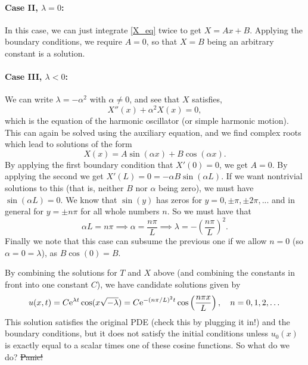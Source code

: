 \documentclass[main.tex]{subfiles}
\begin{document}
\paragraph{Case II, $\lambda=0$:} In this case, we can just integrate \cref{X_eq} twice to get $X = Ax + B$. Applying the boundary conditions, we require $A = 0$, so that $X = B$ being an arbitrary constant is a solution.

\paragraph{Case III, $\lambda<0$:} We can write $\lambda = -\alpha^2$ with $\alpha \neq 0$, and see that $X$ satisfies,
\begin{equation}
    X''(x) + \alpha^2 X(x) = 0,
\end{equation}
which is the equation of the harmonic oscillator (or simple harmonic motion). This can again be solved using the auxiliary equation, and we find complex roots which lead to solutions of the form
\begin{equation}
	X(x) = A \sin(\alpha x) + B \cos(\alpha x).
\end{equation}
By applying the first boundary condition that $X'(0) = 0$, we get $A=0$. By applying the second we get $X'(L) = 0 = -\alpha B \sin(\alpha L)$. If we want nontrivial solutions to this (that is, neither $B$ nor $\alpha$ being zero), we must have $\sin(\alpha L) = 0$. We know that $\sin(y)$ has zeros for $y = 0, \pm\pi, \pm2\pi, ...$ and in general for $y = \pm n\pi$ for all whole numbers $n$. So we must have that
\begin{equation}
	\alpha L = n \pi \implies \alpha = \frac{n \pi}{L} \implies \lambda = -\left(\frac{n \pi}{L}\right)^2.
\end{equation}
Finally we note that this case can subsume the previous one if we allow $n=0$ (so $\alpha=0=\lambda$), as $B\cos(0) = B$.

By combining the solutions for $T$ and $X$ above (and combining the constants in front into one constant $C$), we have candidate solutions given by
\begin{equation}\label{sol}
u(x,t) = C\mathrm{e}^{\lambda t}\cos(x\sqrt{-\lambda}) = C\mathrm{e}^{-(n \pi/L)^2t}\cos\left(\frac{n \pi x}{L}\right), \quad n=0,1,2,\dots
\end{equation}
This solution satisfies the original PDE (check this by plugging it in!) and the boundary conditions, but it does not satisfy the initial conditions unless $u_0(x)$ is exactly equal to a scalar times one of these cosine functions. So what do we do? \sout{Panic!}
\end{document}
